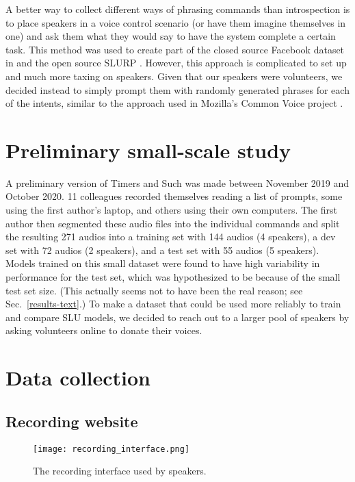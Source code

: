 \documentclass{article}
\begin{document}
A better way to collect different ways of phrasing commands than introspection is to place speakers in a voice control scenario (or have them imagine themselves in one) and ask them what they would say to have the system complete a certain task. This method was used to create part of the closed source Facebook dataset in \cite{Serdyuk2018} and the open source SLURP \cite{slurp}. However, this approach is complicated to set up and much more taxing on speakers. Given that our speakers were volunteers, we decided instead to simply prompt them with randomly generated phrases for each of the intents, similar to the approach used in Mozilla's Common Voice project \cite{ardila2019common}.

\section{Preliminary small-scale study}
A preliminary version of Timers and Such was made between November 2019 and October 2020. 11 colleagues recorded themselves reading a list of prompts, some using the first author's laptop, and others using their own computers. The first author then segmented these audio files into the individual commands and split the resulting 271 audios into a training set with 144 audios (4 speakers), a dev set with 72 audios (2 speakers), and a test set with 55 audios (5 speakers). Models trained on this small dataset were found to have high variability in performance for the test set, which was hypothesized to be because of the small test set size. (This actually seems not to have been the real reason; see Sec.~\ref{results-text}.) To make a dataset that could be used more reliably to train and compare SLU models, we decided to reach out to a larger pool of speakers by asking volunteers online to donate their voices.

\section{Data collection}\label{data-collection}

\subsection{Recording website}\label{recording-website}
\begin{figure}
    \centering
    \texttt{[image: recording\_interface.png]}
    \caption{The recording interface used by speakers.}
    \label{fig:recording-website}
\end{figure}
\end{document}
